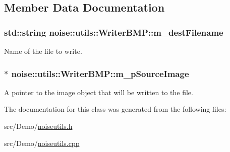 \subsection{Member Data Documentation}
\hypertarget{classnoise_1_1utils_1_1_writer_b_m_p_a2cfd3c61d9db75807eb516626e35d4fd}{
\subsubsection[{m\+\_\+dest\+Filename}]{\setlength{\rightskip}{0pt plus 5cm}std\+::string noise\+::utils\+::\+Writer\+B\+M\+P\+::m\+\_\+dest\+Filename\hspace{0.3cm}{\ttfamily [protected]}}}\label{classnoise_1_1utils_1_1_writer_b_m_p_a2cfd3c61d9db75807eb516626e35d4fd}


Name of the file to write. 

\hypertarget{classnoise_1_1utils_1_1_writer_b_m_p_a0023dafca9882acd3702fb8f47781b9b}{
\subsubsection[{m\+\_\+p\+Source\+Image}]{ $\ast$ noise\+::utils\+::\+Writer\+B\+M\+P\+::m\+\_\+p\+Source\+Image\hspace{0.3cm}{\ttfamily [protected]}}}\label{classnoise_1_1utils_1_1_writer_b_m_p_a0023dafca9882acd3702fb8f47781b9b}


A pointer to the image object that will be written to the file. 



The documentation for this class was generated from the following files\+:\begin{DoxyCompactItemize}
\item 
src/\+Demo/\hyperlink{_demo_2noiseutils_8h}{noiseutils.\+h}\item 
src/\+Demo/\hyperlink{_demo_2noiseutils_8cpp}{noiseutils.\+cpp}\end{DoxyCompactItemize}
